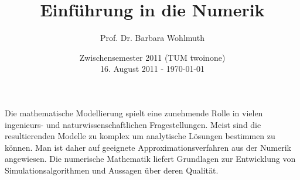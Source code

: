 \documentclass[10pt,a4paper]{article}
\author{Prof. Dr. Barbara Wohlmuth}
\title {Einführung in die Numerik}
\date  {Zwischensemester 2011 (TUM twoinone) \\ 16. August 2011 - \today}
\theoremstyle{definition} \newtheorem{definition}{Definition}[section]
\theoremstyle{remark}     \newtheorem*{bemerkung}{\textbf{Bemerkung}} %
\begin{document}
\maketitle
\pagebreak

\noindent Die mathematische Modellierung spielt eine zunehmende Rolle in vielen
ingenieurs- und naturwissenschaftlichen Fragestellungen.  Meist sind die
resultierenden Modelle zu komplex um analytische Lösungen bestimmen zu können.
Man ist daher auf geeignete Approximationsverfahren aus der Numerik angewiesen.
Die numerische Mathematik liefert Grundlagen zur Entwicklung von
Simulationsalgorithmen und Aussagen über deren Qualität.

\tableofcontents
\pagebreak




\pagebreak
\listofalgorithms
\end{document}
